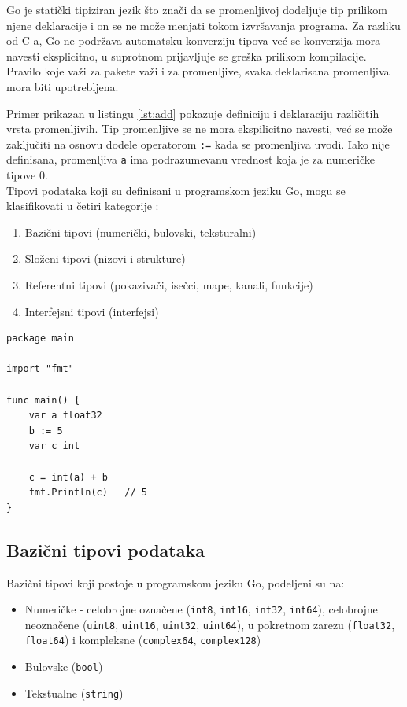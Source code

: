\documentclass[12pt,oneside]{memoir}
\begin{document}
Go je statički tipiziran jezik što znači da se promenljivoj dodeljuje tip prilikom njene deklaracije i on se ne može menjati tokom izvršavanja programa. Za razliku od C-a, Go ne podržava automatsku konverziju tipova već se konverzija mora navesti eksplicitno, u suprotnom prijavljuje se greška prilikom kompilacije. Pravilo koje važi za pakete važi i za promenljive, svaka deklarisana promenljiva mora biti upotrebljena.

Primer prikazan u listingu \ref{lst:add} pokazuje definiciju i deklaraciju različitih vrsta promenljivih. Tip promenljive se ne mora ekspilicitno navesti, već se može zaključiti na osnovu dodele operatorom \texttt{:=} kada se promenljiva uvodi. Iako nije definisana, promenljiva \texttt{a} ima podrazumevanu vrednost koja je za numeričke tipove 0.
\\

Tipovi podataka koji su definisani u programskom jeziku Go, mogu se klasifikovati u četiri kategorije \cite{bookGoProg}: 
\begin{enumerate}
\item Bazični tipovi  (numerički, bulovski, teksturalni)
\item Složeni tipovi (nizovi i strukture)
\item Referentni tipovi (pokazivači, isečci, mape, kanali, funkcije)
\item Interfejsni tipovi (interfejsi)
\end{enumerate}


\begin{center}
\begin{lstlisting}[caption=Primer programa koji ilustruje rad sa promenljivama, label={lst:add},  backgroundcolor=\color{background}]
package main

import "fmt"

func main() {
	var a float32
	b := 5
	var c int

	c = int(a) + b
	fmt.Println(c)	 // 5
}
\end{lstlisting}
\end{center}


\subsection{Bazični tipovi podataka}

Bazični tipovi koji postoje u programskom jeziku Go, podeljeni su na:
\begin{itemize}

\item Numeričke -  celobrojne označene (\texttt{int8}, \texttt{int16}, \texttt{int32}, \texttt{int64}),
 celobrojne neoznačene  (\texttt{uint8}, \texttt{uint16}, \texttt{uint32}, \texttt{uint64}), u pokretnom zarezu (\texttt{float32}, \texttt{float64}) i kompleksne (\texttt{complex64}, \texttt{complex128})

\item Bulovske  (\texttt{bool})

\item Tekstualne (\texttt{string})

\end{itemize}
\end{document}
